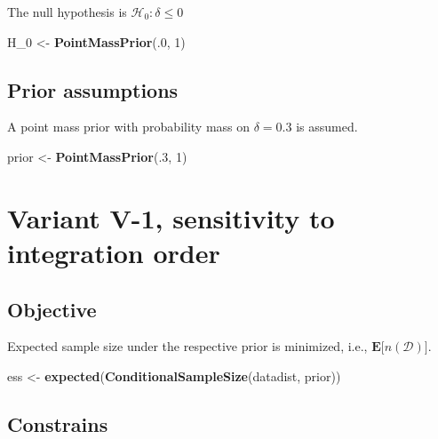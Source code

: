 \documentclass[]{book}
\newenvironment{Shaded}{\begin{snugshade}}{\end{snugshade}}
\newcommand{\DecValTok}[1]{\textcolor[rgb]{0.00,0.00,0.81}{#1}}
\newcommand{\KeywordTok}[1]{\textcolor[rgb]{0.13,0.29,0.53}{\textbf{#1}}}
\newcommand{\NormalTok}[1]{#1}
\newcommand{\StringTok}[1]{\textcolor[rgb]{0.31,0.60,0.02}{#1}}
\begin{document}
The null hypothesis is \(\mathcal{H}_0:\delta \leq 0\)

\begin{Shaded}
\begin{Highlighting}[]
\NormalTok{H_}\DecValTok{0}\NormalTok{ <-}\StringTok{ }\KeywordTok{PointMassPrior}\NormalTok{(.}\DecValTok{0}\NormalTok{, }\DecValTok{1}\NormalTok{)}
\end{Highlighting}
\end{Shaded}

\hypertarget{prior-assumptions-4}{%
\subsection{Prior assumptions}\label{prior-assumptions-4}}

A point mass prior with probability mass on \(\delta = 0.3\) is assumed.

\begin{Shaded}
\begin{Highlighting}[]
\NormalTok{prior <-}\StringTok{ }\KeywordTok{PointMassPrior}\NormalTok{(.}\DecValTok{3}\NormalTok{, }\DecValTok{1}\NormalTok{)}
\end{Highlighting}
\end{Shaded}

\hypertarget{variantV_1}{%
\section{Variant V-1, sensitivity to integration order}\label{variantV_1}}

\hypertarget{objective-10}{%
\subsection{Objective}\label{objective-10}}

Expected sample size under the respective prior is minimized, i.e.,
\(\boldsymbol{E}\big[n(\mathcal{D})\big]\).

\begin{Shaded}
\begin{Highlighting}[]
\NormalTok{ess <-}\StringTok{ }\KeywordTok{expected}\NormalTok{(}\KeywordTok{ConditionalSampleSize}\NormalTok{(datadist, prior))}
\end{Highlighting}
\end{Shaded}

\hypertarget{constrains-10}{%
\subsection{Constrains}\label{constrains-10}}
\end{document}

